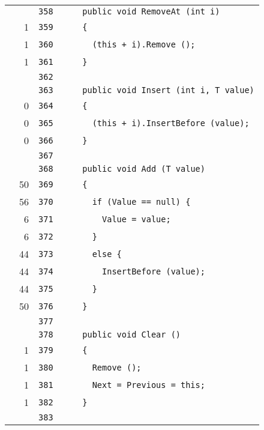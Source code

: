 \documentclass[a4paper,10pt]{article}
\begin{document}
\begin{longtable}[l]{lrrl}
\cellcolor{gray} &  & \verb~358~ & \verb~    public void RemoveAt (int i)~\\
\cellcolor{green} & 1 & \verb~359~ & \verb~    {~\\
\cellcolor{green} & 1 & \verb~360~ & \verb~      (this + i).Remove ();~\\
\cellcolor{green} & 1 & \verb~361~ & \verb~    }~\\
\cellcolor{gray} &  & \verb~362~ & \verb~~\\
\cellcolor{gray} &  & \verb~363~ & \verb~    public void Insert (int i, T value)~\\
\cellcolor{red} & 0 & \verb~364~ & \verb~    {~\\
\cellcolor{red} & 0 & \verb~365~ & \verb~      (this + i).InsertBefore (value);~\\
\cellcolor{red} & 0 & \verb~366~ & \verb~    }~\\
\cellcolor{gray} &  & \verb~367~ & \verb~~\\
\cellcolor{gray} &  & \verb~368~ & \verb~    public void Add (T value)~\\
\cellcolor{green} & 50 & \verb~369~ & \verb~    {~\\
\cellcolor{green} & 56 & \verb~370~ & \verb~      if (Value == null) {~\\
\cellcolor{green} & 6 & \verb~371~ & \verb~        Value = value;~\\
\cellcolor{green} & 6 & \verb~372~ & \verb~      }~\\
\cellcolor{green} & 44 & \verb~373~ & \verb~      else {~\\
\cellcolor{green} & 44 & \verb~374~ & \verb~        InsertBefore (value);~\\
\cellcolor{green} & 44 & \verb~375~ & \verb~      }~\\
\cellcolor{green} & 50 & \verb~376~ & \verb~    }~\\
\cellcolor{gray} &  & \verb~377~ & \verb~~\\
\cellcolor{gray} &  & \verb~378~ & \verb~    public void Clear ()~\\
\cellcolor{green} & 1 & \verb~379~ & \verb~    {~\\
\cellcolor{green} & 1 & \verb~380~ & \verb~      Remove ();~\\
\cellcolor{green} & 1 & \verb~381~ & \verb~      Next = Previous = this;~\\
\cellcolor{green} & 1 & \verb~382~ & \verb~    }~\\
\cellcolor{gray} &  & \verb~383~ & \verb~~\\

\end{longtable}
\end{document}
